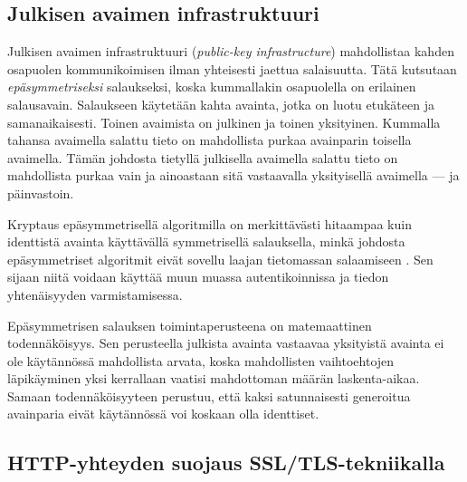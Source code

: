 \documentclass[english,gradu]{tktltiki}
\begin{document}
\subsection{Julkisen avaimen infrastruktuuri} %
\label{sub:julkisen_avaimen_infrastruktuuri}


Julkisen avaimen infrastruktuuri (\emph{public-key infrastructure}) mahdollistaa kahden osapuolen kommunikoimisen ilman yhteisesti jaettua salaisuutta. Tätä kutsutaan \emph{epäsymmetriseksi} salaukseksi, koska kummallakin osapuolella on erilainen salausavain. Salaukseen käytetään kahta avainta, jotka on luotu etukäteen ja samanaikaisesti. Toinen avaimista on julkinen ja toinen yksityinen. Kummalla tahansa avaimella salattu tieto on mahdollista purkaa avainparin toisella avaimella. Tämän johdosta tietyllä julkisella avaimella salattu tieto on mahdollista purkaa vain ja ainoastaan sitä vastaavalla yksityisellä avaimella --- ja päinvastoin.

Kryptaus epäsymmetrisellä algoritmilla on merkittävästi hitaampaa kuin identtistä avainta käyttävällä symmetrisellä salauksella, minkä johdosta epäsymmetriset algoritmit eivät sovellu laajan tietomassan salaamiseen \cite{nist_pki_intro, NIST_SP800-63}. Sen sijaan niitä voidaan käyttää muun muassa autentikoinnissa ja tiedon yhtenäisyyden varmistamisessa.

Epäsymmetrisen salauksen toimintaperusteena on matemaattinen todennäköisyys. Sen perusteella julkista avainta vastaavaa yksityistä avainta ei ole käytännössä mahdollista arvata, koska mahdollisten vaihtoehtojen läpikäyminen yksi kerrallaan vaatisi mahdottoman määrän laskenta-aikaa. Samaan todennäköisyyteen perustuu, että kaksi satunnaisesti generoitua avainparia eivät käytännössä voi koskaan olla identtiset.


\subsection{HTTP-yhteyden suojaus SSL/TLS-tekniikalla} %
\label{sub:tekniikoiden_esittely_ssl_tls}

%
\end{document}
